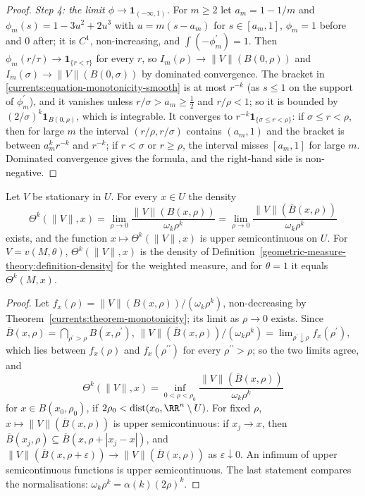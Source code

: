 \begin{proof}
\emph{Step 4: the limit $\phi \to \mathbf{1}_{(-\infty, 1)}$.} For $m \geq 2$ let $a_m = 1 - 1/m$ and $\phi_m(s) = 1 - 3u^2 + 2u^3$ with $u = m(s - a_m)$ for $s \in [a_m, 1]$, $\phi_m = 1$ before and $0$ after; it is $C^1$,
non-increasing, and $\int(-\phi_m^{\prime}) = 1$. Then $\phi_m(r/\tau) \to \mathbf{1}_{\{r < \tau\}}$ for every $r$, so $I_m(\rho) \to \|V\|(B(0, \rho))$ and $I_m(\sigma) \to \|V\|(B(0, \sigma))$ by dominated
convergence. The bracket in \eqref{currents:equation-monotonicity-smooth} is at most $r^{-k}$ (as $s \leq 1$ on the support of $\phi_m^{\prime}$), and it vanishes unless $r/\sigma > a_m \geq \frac12$ and
$r/\rho < 1$; so it is bounded by $(2/\sigma)^k\mathbf{1}_{B(0, \rho)}$, which is integrable. It converges to $r^{-k}\mathbf{1}_{\{\sigma \leq r < \rho\}}$: if $\sigma \leq r < \rho$, then for large $m$ the interval
$(r/\rho, r/\sigma)$ contains $(a_m, 1)$ and the bracket is between $a_m^kr^{-k}$ and $r^{-k}$; if $r < \sigma$ or $r \geq \rho$, the interval misses $[a_m, 1]$ for large $m$. Dominated convergence gives the
formula, and the right-hand side is non-negative.
\end{proof}

\begin{corollary}\label{currents:corollary-density}
Let $V$ be stationary in $U$. For every $x \in U$ the density
\[
\Theta^k(\|V\|, x) = \lim_{\rho \to 0}\frac{\|V\|(B(x, \rho))}{\omega_k\rho^k} = \lim_{\rho \to 0}\frac{\|V\|(\overline{B}(x, \rho))}{\omega_k\rho^k}
\]
exists, and the function $x \mapsto \Theta^k(\|V\|, x)$ is upper semicontinuous on $U$. For $V = v(M, \theta)$, $\Theta^k(\|V\|, x)$ is the density of Definition~\ref{geometric-measure-theory:definition-density}
for the weighted measure, and for $\theta = 1$ it equals $\Theta^k(M, x)$.
\end{corollary}

\begin{proof}
Let $f_x(\rho) = \|V\|(B(x, \rho))/(\omega_k\rho^k)$, non-decreasing by Theorem~\ref{currents:theorem-monotonicity}; its limit as $\rho \to 0$ exists. Since $\overline{B}(x, \rho) = \bigcap_{\rho^{\prime} > \rho}B(x, \rho^{\prime})$,
$\|V\|(\overline{B}(x, \rho))/(\omega_k\rho^k) = \lim_{\rho^{\prime} \downarrow \rho}f_x(\rho^{\prime})$, which lies between $f_x(\rho)$ and $f_x(\rho^{\prime\prime})$ for every $\rho^{\prime\prime} > \rho$; so the two limits agree, and
\[
\Theta^k(\|V\|, x) = \inf_{0 < \rho < \rho_0}\frac{\|V\|(\overline{B}(x, \rho))}{\omega_k\rho^k}
\]
for $x \in B(x_0, \rho_0)$, if $2\rho_0 < \operatorname{dist}(x_0, \RR^n \setminus U)$. For fixed $\rho$, $x \mapsto \|V\|(\overline{B}(x, \rho))$ is upper semicontinuous: if $x_j \to x$, then
$\overline{B}(x_j, \rho) \subseteq \overline{B}(x, \rho + |x_j - x|)$, and $\|V\|(\overline{B}(x, \rho + \varepsilon)) \to \|V\|(\overline{B}(x, \rho))$ as $\varepsilon \downarrow 0$. An infimum of upper semicontinuous
functions is upper semicontinuous. The last statement compares the normalisations: $\omega_k\rho^k = \alpha(k)(2\rho)^k$.
\end{proof}

